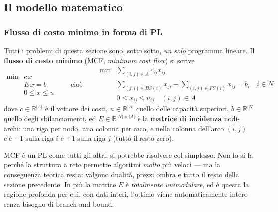 \documentclass[12pt]{extarticle} %
\begin{document}
\subsection{Il modello matematico}

\subsubsection{Flusso di costo minimo in forma di PL}
Tutti i problemi di questa sezione sono, sotto sotto, \emph{un solo} programma lineare. Il \textbf{flusso di costo minimo} (MCF, \emph{minimum cost flow}) si scrive
\[
\begin{array}{ll}
\min & c\,x \\
     & E\,x = b \\
     & 0 \le x \le u
\end{array}
\qquad\text{cioè}\qquad
\begin{array}{ll}
\min & \displaystyle\sum_{(i,j)\in A} c_{ij}x_{ij} \\[2mm]
     & \displaystyle\sum_{(j,i)\in BS(i)} x_{ji} - \sum_{(i,j)\in FS(i)} x_{ij} = b_i \quad i \in N\\[2mm]
     & 0 \le x_{ij} \le u_{ij} \quad (i,j)\in A
\end{array}
\]
dove $c \in \mathbb{R}^{|A|}$ è il vettore dei costi, $u \in \mathbb{R}^{|A|}$ quello delle capacità superiori, $b \in \mathbb{R}^{|N|}$ quello degli sbilanciamenti, ed $E \in \mathbb{R}^{|N|\times|A|}$ è la \textbf{matrice di incidenza} nodi-archi: una riga per nodo, una colonna per arco, e nella colonna dell'arco $(i,j)$ c'è $-1$ sulla riga $i$ e $+1$ sulla riga $j$ (tutto il resto zero).

\begin{tcolorbox}[colback=blue!4, colframe=blue!50!black, title=\textbf{Perché è importante saperlo}]
MCF è un PL come tutti gli altri: si potrebbe risolvere col simplesso. Non lo si fa perché la struttura a rete permette algoritmi \emph{molto} più veloci --- ma la conseguenza teorica resta: valgono dualità, prezzi ombra e tutto il resto della sezione precedente. In più la matrice $E$ è \emph{totalmente unimodulare}, ed è questa la ragione profonda per cui, con dati interi, l'ottimo viene automaticamente intero senza bisogno di branch-and-bound.
\end{tcolorbox}
\end{document}
